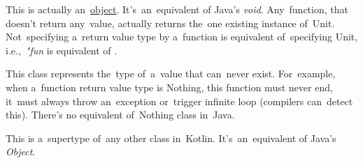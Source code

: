 
\label{kotlinunit}
This is actually an~\hyperref[kotlinobject]{object}.
It's~an~equivalent of Java's \textit{void}.
Any~function, that doesn't return any~value, actually returns the~one existing instance of~Unit.
Not~specifying a~return value type by a~function is equivalent of~specifying Unit, \mbox{i.e., \textit{"fun}}  is equivalent of .

\label{kotlinnothing}
This class represents the~type of~a~value that can~never exist.
For~example, when a~function return value type is Nothing, this function must never end, it~must always throw an~exception or~trigger infinite loop (compilers can~detect this).
There's no equivalent of~Nothing class in~Java.

This is a~supertype of~any other class in~Kotlin.
It's~an~equivalent of Java's \textit{Object}.
